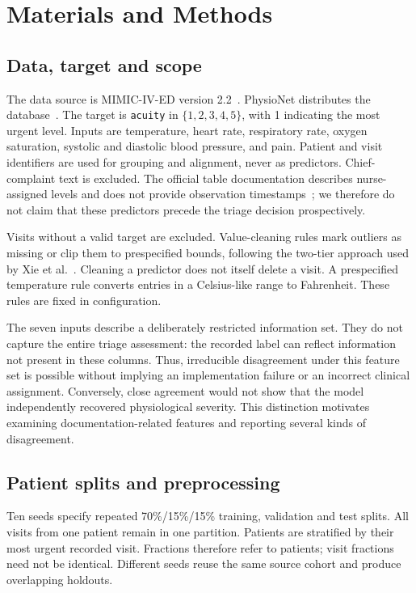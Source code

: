 \section{Materials and Methods}
\subsection{Data, target and scope}
The data source is MIMIC-IV-ED version 2.2~\cite{mimicived22}.
PhysioNet distributes the database~\cite{physionet2026,goldberger2000physionet}.
The target is \texttt{acuity} in $\{1,2,3,4,5\}$, with 1 indicating the most
urgent level. Inputs are temperature, heart rate, respiratory rate, oxygen
saturation, systolic and diastolic blood pressure, and pain. Patient and visit
identifiers are used for grouping and alignment, never as predictors.
Chief-complaint text is excluded.
The official table documentation describes nurse-assigned levels and does not
provide observation timestamps~\cite{mimictriagedoc}; we therefore do not claim
that these predictors precede the triage decision prospectively.

Visits without a valid target are excluded. Value-cleaning rules mark outliers
as missing or clip them to prespecified bounds, following the two-tier approach
used by Xie et al.~\cite{xie2022benchmark}. Cleaning a predictor does not itself
delete a visit. A prespecified temperature rule converts entries in a
Celsius-like range to Fahrenheit. These rules are fixed in configuration.

The seven inputs describe a deliberately restricted information set. They
do not capture the entire triage assessment: the recorded label can reflect
information not present in these columns. Thus, irreducible disagreement
under this feature set is possible without implying an implementation
failure or an incorrect clinical assignment. Conversely, close agreement
would not show that the model independently recovered physiological severity.
This distinction motivates examining documentation-related features and
reporting several kinds of disagreement.

\subsection{Patient splits and preprocessing}
Ten seeds specify repeated 70\%/15\%/15\% training, validation and test splits.
All visits from one patient remain in one partition. Patients are stratified
by their most urgent recorded visit. Fractions therefore refer to patients;
visit fractions need not be identical. Different seeds reuse the same source
cohort and produce overlapping holdouts.

